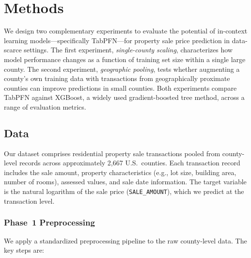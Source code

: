 \section{Methods}\label{sec:methods}

We design two complementary experiments to evaluate the potential of in-context learning models---specifically TabPFN---for property sale price prediction in data-scarce settings. The first experiment, \emph{single-county scaling}, characterizes how model performance changes as a function of training set size within a single large county. The second experiment, \emph{geographic pooling}, tests whether augmenting a county's own training data with transactions from geographically proximate counties can improve predictions in small counties. Both experiments compare TabPFN against XGBoost, a widely used gradient-boosted tree method, across a range of evaluation metrics.

\subsection{Data}\label{sec:data}

Our dataset comprises residential property sale transactions pooled from county-level records across approximately 2,667 U.S.\ counties. Each transaction record includes the sale amount, property characteristics (e.g., lot size, building area, number of rooms), assessed values, and sale date information. The target variable is the natural logarithm of the sale price (\texttt{SALE\_AMOUNT}), which we predict at the transaction level.

\subsubsection{Phase~1 Preprocessing}\label{sec:phase1}

We apply a standardized preprocessing pipeline to the raw county-level data. The key steps are:

